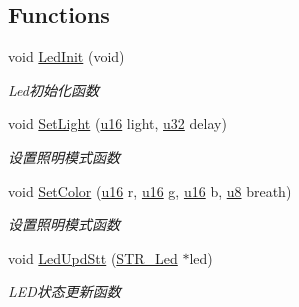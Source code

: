 \subsection*{\-Functions}
\begin{DoxyCompactItemize}
\item 
void \hyperlink{group___l_e_d_ga1d5b4eaf7f01ae9557ba620158ebdfd9}{\-Led\-Init} (void)
\begin{DoxyCompactList}\small\item\em \-Led初始化函数 \end{DoxyCompactList}\item 
void \hyperlink{group___l_e_d_gae8b99ece48c700224bfdc62518a1a0ec}{\-Set\-Light} (\hyperlink{group___b_s_p_ga9e6c91d77e24643b888dbd1a1a590054}{u16} light, \hyperlink{group___b_s_p_ga10e94b422ef0c20dcdec20d31a1f5049}{u32} delay)
\begin{DoxyCompactList}\small\item\em 设置照明模式函数 \end{DoxyCompactList}\item 
void \hyperlink{group___l_e_d_gacc86e7dba3879210d60ccc467ae5e228}{\-Set\-Color} (\hyperlink{group___b_s_p_ga9e6c91d77e24643b888dbd1a1a590054}{u16} r, \hyperlink{group___b_s_p_ga9e6c91d77e24643b888dbd1a1a590054}{u16} g, \hyperlink{group___b_s_p_ga9e6c91d77e24643b888dbd1a1a590054}{u16} b, \hyperlink{group___b_s_p_gaed742c436da53c1080638ce6ef7d13de}{u8} breath)
\begin{DoxyCompactList}\small\item\em 设置照明模式函数 \end{DoxyCompactList}\item 
void \hyperlink{group___l_e_d_ga5e50d2839709fdab79e8efb08d9d69cd}{\-Led\-Upd\-Stt} (\hyperlink{struct_s_t_r___led}{\-S\-T\-R\-\_\-\-Led} $\ast$led)
\begin{DoxyCompactList}\small\item\em \-L\-E\-D状态更新函数 \end{DoxyCompactList}\end{DoxyCompactItemize}
